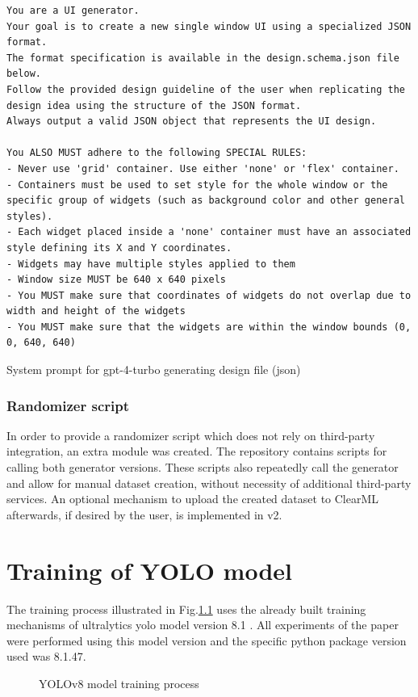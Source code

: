 \documentclass[Bachelor, BIC, english, fhCitStyle, IEEE]{BASE/twbook} %
\newcommand{\nocontentsline}[3]{}
\newcommand{\hidsubsection}[1]{\bgroup\let\addcontentsline=\nocontentsline\subsection{#1}\egroup}
\begin{document}
\begin{listing}[htbp]
    \begin{verbatim}
You are a UI generator.
Your goal is to create a new single window UI using a specialized JSON format.
The format specification is available in the design.schema.json file below.
Follow the provided design guideline of the user when replicating the design idea using the structure of the JSON format.
Always output a valid JSON object that represents the UI design.

You ALSO MUST adhere to the following SPECIAL RULES:
- Never use 'grid' container. Use either 'none' or 'flex' container.
- Containers must be used to set style for the whole window or the specific group of widgets (such as background color and other general styles).
- Each widget placed inside a 'none' container must have an associated style defining its X and Y coordinates.
- Widgets may have multiple styles applied to them
- Window size MUST be 640 x 640 pixels
- You MUST make sure that coordinates of widgets do not overlap due to width and height of the widgets
- You MUST make sure that the widgets are within the window bounds (0, 0, 640, 640)
    \end{verbatim}
    \caption{System prompt for gpt-4-turbo generating design file (\ac{json})}
    \label{code:gpt4-design-json-system-prompt}
\end{listing}
\hidsubsection{Randomizer script}
In order to provide a randomizer script which does not rely on third-party integration, an extra module was created. The repository \autocite{HackXItUi_randomizer14d441c38a37850f4809471124bea3c36b9bc0b7} contains scripts for calling both generator versions. These scripts also repeatedly call the generator and allow for manual dataset creation, without necessity of additional third-party services. An optional mechanism to upload the created dataset to ClearML afterwards, if desired by the user, is implemented in v2.
\newpage
\chapter{Training of YOLO model}
The training process illustrated in Fig.\ref{fig:yolo-train} uses the already built training mechanisms of ultralytics \autocite{jocherUltralyticsYOLO2023} \ac{yolo} model version 8.1 \autocite{UltralyticsUltralyticsV8}. All experiments of the paper were performed using this model version and the specific python package version used was 8.1.47.
\begin{figure}[!htbp]
    \caption{YOLOv8 model training process}
    \centering
    
    \label{fig:yolo-train}
\end{figure}
\end{document}
